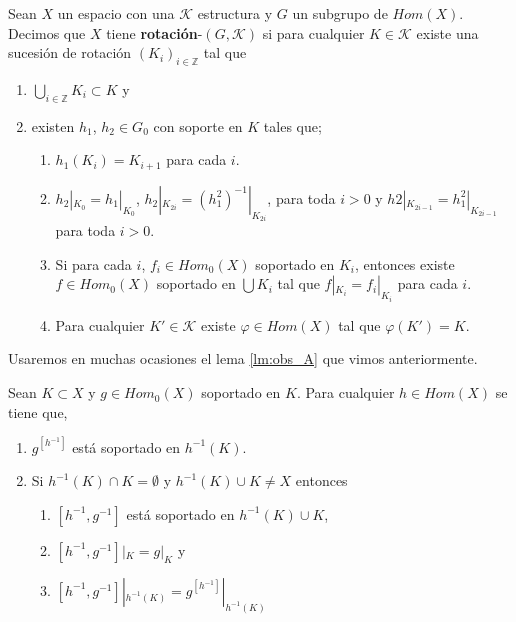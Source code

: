 \documentclass{subfiles}
\begin{document}
\begin{df}
Sean $X$ un espacio con una $\mathcal{K}$ estructura y $G$ un subgrupo de $Hom(X)$. Decimos que $X$ tiene \textbf{rotación}-$(G,\mathcal{K})$ si para cualquier $K \in \mathcal{K}$ existe una sucesión de rotación $(K_i)_{i \in \mathbb{Z}}$ tal que 

	\begin{enumerate}
	\item $\bigcup_{i \in \mathbb{Z}} K_i \subset K$ y
	\item existen $h_1$, $h_2 \in G_0$ con soporte en $K$ tales que;  

		\begin{enumerate}
		\item $h_1(K_i)=K_{i+1}$ para cada $i$.
		\item $h_2|_{K_0}=h_1|_{K_0}$, $h_2|_{K_{2i}}=(h_1^2)^{-1}|_{K_{2i}}$, para toda $i >0$ y $h2|_{K_{2i-1}}=h_1^2|_{K_{2i-1}}$ para toda $i >0$.
		\item Si para cada $i$, $f_i \in Hom_0(X)$ soportado en $K_i$, entonces existe $f \in Hom_0(X)$ soportado en $\bigcup K_i$ tal que $f|_{K_i}=f_i|_{K_i}$ para cada $i$.
		\item Para cualquier $K' \in \mathcal{K}$ existe $\varphi \in Hom(X)$ tal que $\varphi(K')=K.$

		\end{enumerate}

	\end{enumerate}
\end{df}

Usaremos en muchas ocasiones el lema \ref{lm:obs_A} que vimos anteriormente. 

\begin{lm}\label{lm:obs_A_2}
Sean $K \subset X$ y $g \in Hom_0(X)$ soportado en $K$. Para cualquier $h \in Hom(X)$ se tiene que,
 
	\begin{enumerate}
	\item  $g^{[h^{-1}]}$ está soportado en $h^{-1}(K)$.
	\item Si $h^{-1}(K) \cap K = \emptyset$ y $h^{-1}(K) \cup K \neq X$  entonces
		\begin{enumerate}
		\item $[h^{-1},g^{-1}]$ está soportado en $h^{-1}(K) \cup K$,
		\item $[h^{-1},g^{-1}]|_K=g|_K$ y 
		\item $[h^{-1},g^{-1}]|_{h^{-1}(K)}=g^{[h^{-1}]}|_{h^{-1}(K)}$
		\end{enumerate}	
	\end{enumerate}
\end{lm}
\end{document}
